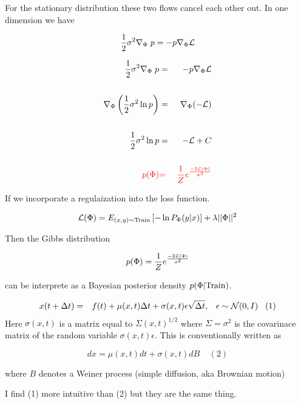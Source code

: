 {\vfill
For the stationary distribution these two flows cancel each other out.
In one dimension we have

$$\frac{1}{2} \sigma^2 \nabla_\Phi\; {p} = - p\nabla_\Phi {\cal L}$$


\vspace{-2ex}
\begin{eqnarray*}
\frac{1}{2} \sigma^2 \nabla_\Phi\; {p} & = & - p\nabla_\Phi {\cal L} \\
\\
\nabla_\Phi \left(\frac{1}{2} \sigma^2 \ln p\right) & = &  \nabla_\Phi (- {\cal L}) \\
\\
\frac{1}{2} \sigma^2 \ln p & = & - {\cal L} + C \\
\\
{\color{red} p(\Phi)} & {\color{red} =} & {\color{red} \frac{1}{Z}e^{\frac{-2{\cal L}(\Phi)}{\sigma^2}}}
\end{eqnarray*}


If we incorporate a regulaization into the loss function.

$${\cal L}(\Phi) = E_{(x,y) \sim \mathrm{Train}} \left[-\ln P_\Phi(y|x)\right] + \lambda ||\Phi||^2$$

\vfill
Then the Gibbs distribution

$$p(\Phi)  =  \frac{1}{Z}e^{\frac{-2{\cal L}(\Phi)}{\sigma^2}}$$

\vfill
can be interprete as a Bayesian posterior density $p(\Phi|\mathrm{Train})$.




{\huge
\begin{eqnarray*}
x(t + \Delta t) &  =  & f(t) + \mu(x,t)\Delta t + \sigma(x,t)\epsilon \sqrt{\Delta t},\;\;\;\epsilon \sim {\cal N}(0,I)\;\;\;(1)
 \end{eqnarray*}
}
\vfill
Here $\sigma(x,t)$ is a matrix equal to $\Sigma(x,t)^{1/2}$ where $\Sigma = \sigma^2$ is the covarinace matrix of the random variable $\sigma(x,t)\epsilon$.
\vfill
This is conventionally written as

$$dx = \mu(x,t)dt + \sigma(x,t)dB\;\;\;\;(2)$$

\vfill
where $B$ denotes a Weiner process (simple diffusion, aka Brownian motion)

\vfill
I find (1) more intuitive than (2) but they are the same thing.

}
